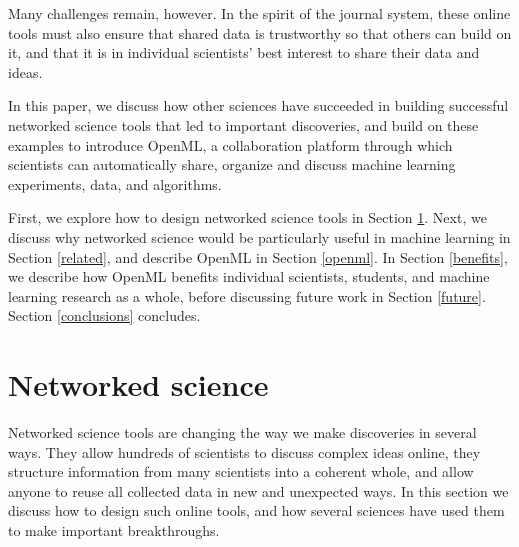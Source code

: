 \documentclass{acmproc-sp}
\begin{document}
Many challenges remain, however. In the spirit of the journal system, these online tools must also ensure that shared data is trustworthy so that others can build on it, and that it is in individual scientists' best interest to share their data and ideas.

In this paper, we discuss how other sciences have succeeded in building successful networked science tools that led to important discoveries, and build on these examples to introduce OpenML, a collaboration platform through which scientists can automatically share, organize and discuss machine learning experiments, data, and algorithms.

First, we explore how to design networked science tools in Section \ref{networkedscience}. Next, we discuss why networked science would be particularly useful in machine learning in Section \ref{related}, and describe OpenML in Section \ref{openml}. In Section \ref{benefits}, we describe how OpenML benefits individual scientists, students, and machine learning research as a whole, before discussing future work in Section \ref{future}. Section \ref{conclusions} concludes.

\section{Networked science}
\label{networkedscience}
Networked science tools are changing the way we make discoveries in several ways. They allow hundreds of scientists to discuss complex ideas online, they structure information from many scientists into a coherent whole, and allow anyone to reuse all collected data in new and unexpected ways. In this section we discuss how to design such online tools, and how several sciences have used them to make important breakthroughs.
\end{document}
